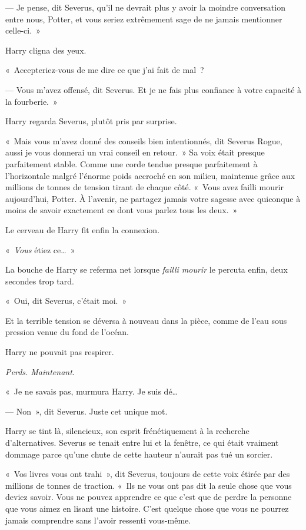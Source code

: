 --- Je pense, dit Severus, qu'il ne devrait plus y avoir la moindre conversation entre nous, Potter, et vous seriez extrêmement sage de ne jamais mentionner celle-ci.~»

Harry cligna des yeux.

«~Accepteriez-vous de me dire ce que j'ai fait de mal~?

--- Vous m'avez offensé, dit Severus.
Et je ne fais plus confiance à votre capacité à la fourberie.~»

Harry regarda Severus, plutôt pris par surprise.

«~Mais vous m'avez donné des conseils bien intentionnés, dit Severus Rogue, aussi je vous donnerai un vrai conseil en retour.~»
Sa voix était presque parfaitement stable.
Comme une corde tendue presque parfaitement à l'horizontale malgré l'énorme poids accroché en son milieu, maintenue grâce aux millions de tonnes de tension tirant de chaque côté.
«~Vous avez failli mourir aujourd'hui, Potter.
À l'avenir, ne partagez jamais votre sagesse avec quiconque à moins de savoir exactement ce dont vous parlez tous les deux.~»

Le cerveau de Harry fit enfin la connexion.

«~\emph{Vous} étiez ce…~»

La bouche de Harry se referma net lorsque \emph{failli mourir} le percuta enfin, deux secondes trop tard.

«~Oui, dit Severus, c'était moi.~»

Et la terrible tension se déversa à nouveau dans la pièce, comme de l'eau sous pression venue du fond de l'océan.

Harry ne pouvait pas respirer.

\emph{Perds.
Maintenant}.

«~Je ne savais pas, murmura Harry.
Je suis dé…

--- Non~», dit Severus.
Juste cet unique mot.

Harry se tint là, silencieux, son esprit frénétiquement à la recherche d'alternatives.
Severus se tenait entre lui et la fenêtre, ce qui était vraiment dommage parce qu'une chute de cette hauteur n'aurait pas tué un sorcier.

«~Vos livres vous ont trahi~», dit Severus, toujours de cette voix étirée par des millions de tonnes de traction.
«~Ils ne vous ont pas dit la seule chose que vous deviez savoir.
Vous ne pouvez apprendre ce que c'est que de perdre la personne que vous aimez en lisant une histoire.
C'est quelque chose que vous ne pourrez jamais comprendre sans l'avoir ressenti vous-même.


